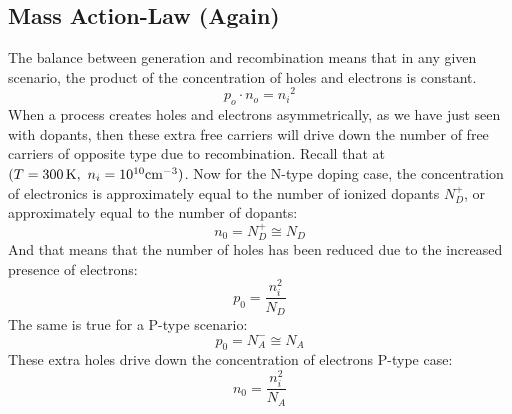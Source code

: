 \subsection{Mass Action-Law (Again)}
The balance between generation and recombination means that in any given scenario, the product of the concentration of holes and electrons is constant.  
    \begin{equation}
        {p_o} \cdot {n_o} = {n_i}^2
    \end{equation} 
When a process creates holes and electrons asymmetrically, as we have just seen with dopants, then these extra free carriers will drive down the number of free carriers of opposite type due to recombination.   Recall that at $(T = 300\,{\rm{K}},\,\,{n_i} = {10^{10}}{\rm{c}}{{\rm{m}}^{ - 3}})$.  Now for the N-type doping case, the concentration of electronics is approximately equal to the number of ionized dopants $N_D^+$, or approximately equal to the number of dopants:
    \begin{equation}
        {n_0} = N_D^+  \cong {N_D}
    \end{equation}
And that means that the number of holes has been reduced due to the increased presence of electrons:
    \begin{equation}
        p_0 = \frac{n_i^2}{N_D}
    \end{equation}
The same is true for a P-type scenario:
    \begin{equation}
        {p_0} = N_A^ -  \cong {N_A} 
    \end{equation}
These extra holes drive down the concentration of electrons 
{ P-type case:}
    \begin{equation}
        n_0 = \frac{n_i^2}{N_A}
    \end{equation}
